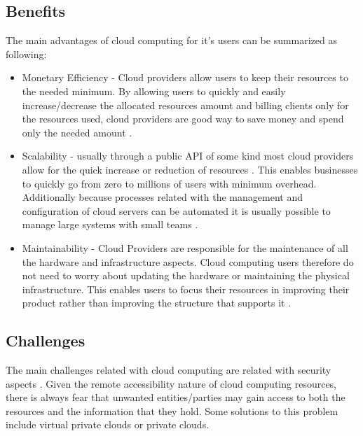 		\subsection{Benefits} \label{chap:stateoftheheart:sec:cloud:sec:benefits}
			The main advantages of cloud computing for it's users can be summarized as following:
			\begin{itemize}

				\item{Monetary Efficiency} - Cloud providers allow users to keep their resources to the needed minimum. By allowing users to quickly and easily increase/decrease the allocated resources amount and billing clients only for the resources used, cloud providers are good way to save money and spend only the needed amount \cite{Garrison2012,Mell2011}.
		    
				\item{Scalability} - usually through a public API of some kind most cloud providers allow for the quick increase or reduction of resources \cite{Mell2011}. This enables businesses to quickly go from zero to millions of users with minimum overhead. Additionally because processes related with the management and configuration of cloud servers can be automated it is usually possible to manage large systems with small teams \cite{Loukides2012}. 
		    
		    	\item{Maintainability} - Cloud Providers are responsible for the maintenance of all the hardware and infrastructure aspects. Cloud computing users therefore do not need to worry about updating the hardware or maintaining the physical infrastructure. This enables users to focus their resources in improving their product rather than improving the structure that supports it \cite{Garrison2012}.
			\end{itemize}
            
		\subsection{Challenges} \label{chap:stateoftheheart:sec:cloud:sec:challenges}

		The main challenges related with cloud computing are related with security aspects \cite{Zhang2010}. Given the remote accessibility nature of cloud computing resources, there is always fear that unwanted entities/parties may gain access to both the resources and the information that they hold. Some solutions to this problem include virtual private clouds or private clouds. 



